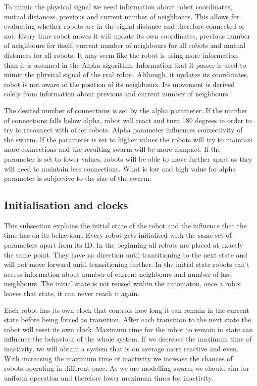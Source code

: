 To mimic the physical signal we need information about robot coordinates, mutual distances, previous and current number of neighbours. This allows for evaluating whether robots are in the signal distance and therefore connected or not. Every time robot moves it will update its own coordinates, previous number of neighbours for itself, current number of neighbours for all robots and mutual distances for all robots. It may seem like the robot is using more information than it is assumed in the Alpha algorithm. Information that it passes is used to mimic the physical signal of the real robot. Although, it updates its coordinates, robot is not aware of the position of its neighbours. Its movement is derived solely from information about previous and current number of neighbours. 

The desired number of connections is set by the alpha parameter. If the number of connections falls below alpha, robot will react and turn 180 degrees in order to try to reconnect with other robots. Alpha parameter influences connectivity of the swarm. If the parameter is set to higher values the robots will try to maintain more connections and the resulting swarm will be more compact. If the parameter is set to lower values, robots will be able to move further apart as they will need to maintain less connections. What is low and high value for alpha parameter is subjective to the size of the swarm.

\subsection{Initialisation and clocks}
This subsection explains the initial state of the robot and the influence that the time has on its behaviour. Every robot gets initialised with the same set of parameters apart from its ID. In the beginning all robots are placed at exactly the same point. They have no direction until transitioning to the next state and will not move forward until transitioning further. In the initial state robots can't access information about number of current neighbours and number of last neighbours. The initial state is not reused within the automaton, once a robot leaves that state, it can never reach it again.

Each robot has its own clock that controls how long it can remain in the current state before being forced to transition. After each transition to the next state the robot will reset its own clock. Maximum time for the robot to remain in state can influence the behaviour of the whole system. If we decrease the maximum time of inactivity, we will obtain a system that is on average more reactive and even. With increasing the maximum time of inactivity we increase the chances of robots operating in different pace. As we are modelling swarm we should aim for uniform operation and therefore lower maximum times for inactivity.


